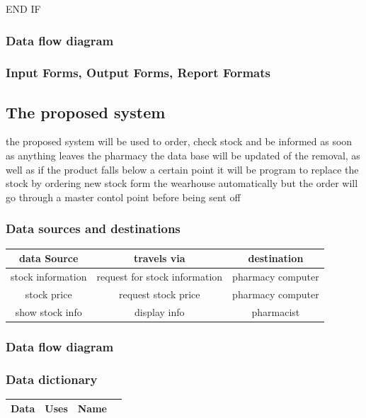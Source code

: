 END IF

\subsubsection{Data flow diagram}




\subsubsection{Input Forms, Output Forms, Report Formats}

\subsection{The proposed system}
the proposed system will be used to order, check stock and be informed as soon as anything leaves the pharmacy the data base will be updated of the removal, as well as if the product falls below a certain point it will be program to replace the stock by ordering new stock form the wearhouse automatically but the order will go through a master contol point before being sent off 
\subsubsection{Data sources and destinations}
\begin{table}
\begin{tabular}{|c|c|c|}
\hline\hline
data Source & travels via & destination\\
\hline
stock information & request for stock information & pharmacy computer\\
\hline
stock price & request stock price & pharmacy computer\\
\hline
show stock info & display info & pharmacist\\ 
\hline
\end{tabular}
\label{table:nonlin}

\end{table}
\subsubsection{Data flow diagram}

\subsubsection{Data dictionary}
\begin{table}
\begin{tabular}{|c|c|c|c|}
\hline
Data & Uses & Name \\
\hline

\end{tabular}
\label{table:nonlin}
\end{table}

